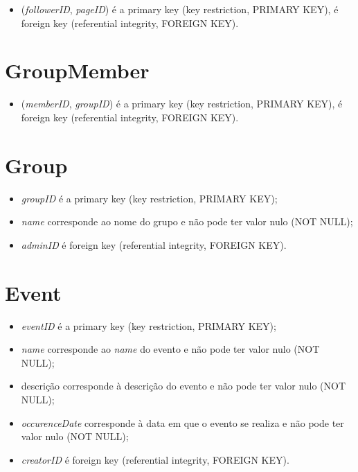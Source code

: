 \documentclass[12pt]{report}
\begin{document}
\begin{itemize}
    \item (\textit{followerID}, \textit{pageID}) é a primary key (key restriction, PRIMARY KEY), é foreign key (referential integrity, FOREIGN KEY).
\end{itemize}

\section{GroupMember}

\begin{itemize}
    \item (\textit{memberID}, \textit{groupID}) é a primary key (key restriction, PRIMARY KEY), é foreign key (referential integrity, FOREIGN KEY).
\end{itemize}

\section{Group}

\begin{itemize}
    \item \textit{groupID} é a primary key (key restriction, PRIMARY KEY);
    \item \textit{name} corresponde ao nome do grupo e não pode ter valor nulo (NOT NULL);
    \item \textit{adminID} é foreign key (referential integrity, FOREIGN KEY).
\end{itemize}

\section{Event}

\begin{itemize}
    \item \textit{eventID} é a primary key (key restriction, PRIMARY KEY);
    \item \textit{name}  corresponde ao \textit{name} do evento e não pode ter valor nulo (NOT NULL);
    \item descrição  corresponde à descrição do evento e não pode ter valor nulo (NOT NULL);
    \item \textit{occurenceDate} corresponde à data em que o evento se realiza e não pode ter valor nulo (NOT NULL);
    \item \textit{creatorID} é foreign key (referential integrity, FOREIGN KEY).
\end{itemize}
\end{document}
